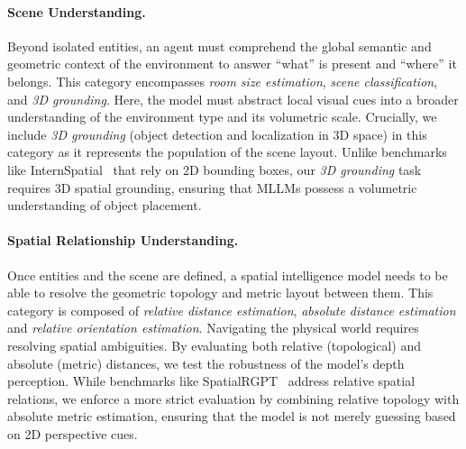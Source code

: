 \documentclass{article}
\begin{document}
\paragraph{Scene Understanding.} Beyond isolated entities, an agent must comprehend the global semantic and geometric context of the environment to answer ``what'' is present and ``where'' it belongs.
This category encompasses \textit{room size estimation}, \textit{scene classification}, and \textit{3D grounding}.
Here, the model must abstract local visual cues into a broader understanding of the environment type and its volumetric scale.
Crucially, we include \textit{3D grounding} (object detection and localization in 3D space) in this category as it represents the population of the scene layout.
Unlike benchmarks like InternSpatial~\cite{deng2025internspatial} that rely on 2D bounding boxes, our \textit{3D grounding} task requires 3D spatial grounding, ensuring that MLLMs possess a volumetric understanding of object placement. 



\paragraph{Spatial Relationship Understanding.} Once entities and the scene are defined, a spatial intelligence model needs to be able to resolve the geometric topology and metric layout between them.
This category is composed of \textit{relative distance estimation}, \textit{absolute distance estimation} and \textit{relative orientation estimation}.
Navigating the physical world requires resolving spatial ambiguities. By evaluating both relative (topological) and absolute (metric) distances, we test the robustness of the model's depth perception.
While benchmarks like SpatialRGPT~\cite{cheng2024spatialrgpt} address relative spatial relations, we enforce a more strict evaluation by combining relative topology with absolute metric estimation, ensuring that the model is not merely guessing based on 2D perspective cues.
\end{document}
